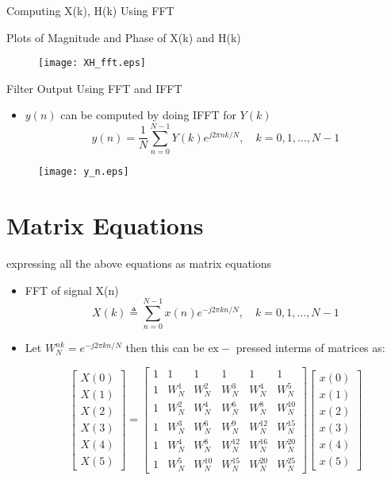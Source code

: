 \documentclass[english,10pt]{beamer}
\begin{document}
{\begin{frame}{Computing X(k), H(k) Using  FFT   }
\end{frame} 
\begin{frame}{Plots of Magnitude and Phase of  X(k) and H(k) }
\begin{figure}
    \centering
    \texttt{[image: XH\_fft.eps]}
\end{figure}

\end{frame} 
\begin{frame}{Filter Output Using FFT and IFFT}
\begin{itemize}
    \item $y(n)$ can be computed by doing IFFT for $Y(k)$
    \[y(n) = \frac{1}{N}\sum_{n=0}^{N-1}Y(k) e^{j 2 \pi n k / N}, \quad k=0,1, \ldots, N-1\]
\end{itemize}
\begin{figure}
    \centering
    \texttt{[image: y\_n.eps]}
\end{figure}
\end{frame}

\section{Matrix Equations}
\begin{frame}{expressing all the above equations as matrix equations}
\begin{itemize}
       \item FFT of signal X(n) 
   \[
        X(k) \triangleq \sum_{n=0}^{N-1} x(n) e^{-j 2 \pi k n / N}, \quad k=0,1, \ldots, N-1
    \]
    \item Let $W_{N}^{n k}=e^{-j 2 \pi k n / N}$ then this can be $\mathrm{ex}-$ pressed interms of matrices as:
    
       \[ \begin{bmatrix} X(0) \\ X(1) \\ X(2) \\ X(3) \\ X(4) \\ X(5) \end{bmatrix}
=
\begin{bmatrix}
1 & 1 & 1 & 1 & 1 & 1 \\ 1 & W_N^1& W_N^2& W_N^3 & W_N^4 & W_N^5\\1 & W_N^2 & W_N^4 & W_N^6 & W_N^8 & W_N^{10}\\1 & W_N^3 & W_N^6 & W_N^9 & W_N^{12} & W_N^{15}\\1 & W_N^4 & W_N^8 & W_N^{12} & W_N^{16} & W_N^{20}\\1 & W_N^5 & W_N^{10} & W_N^{15} & W_N^{20} &W_N^{25}
\end{bmatrix}\begin{bmatrix}
x(0) \\ x(1) \\ x(2) \\ x(3) \\ x(4) \\x(5)
\end{bmatrix}\]
\end{itemize}




\end{frame}}
\end{document}
